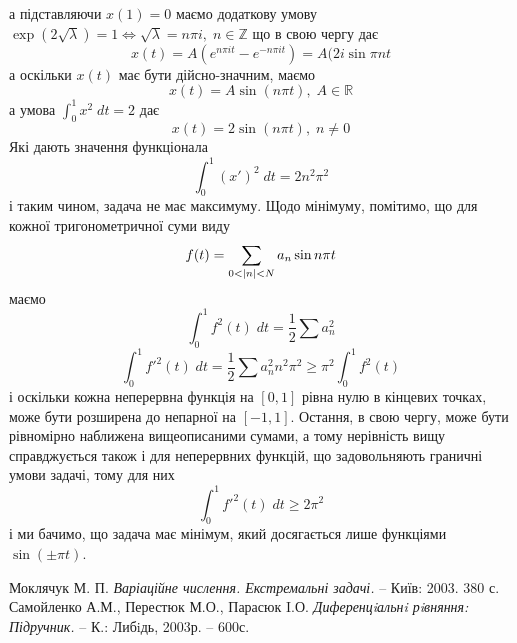 \documentclass[12pt]{article} %
\newcommand{\dt}{\;dt}
\begin{document}
	а підставляючи $x(1)=0$ маємо додаткову умову $\exp(2\sqrt{\lambda})=1\iff \sqrt{\lambda}=n\pi i,\;n\in\mathbb{Z}$ що в свою чергу дає
	\[x(t)=A(e^{n\pi it}-e^{-n\pi it})=A(2i\sin\pi nt\]
	а оскільки $x(t)$ має бути дійсно-значним, маємо
	\[x(t)=A\sin(n\pi t),\;A\in\mathbb{R}\]
	а умова $\int_0^1x^2\dt=2$ дає
	\[x(t)={2}\sin(n\pi t),\;n\neq0\]
	Які дають значення функціонала
	\[\int_0^1(x')^2\dt=2n^2\pi^2\]
	і таким чином, задача не має максимуму. Щодо мінімуму, помітимо, що для кожної тригонометричної суми виду
	\[f(t)=\sum_{0<\myabs{n}<N}a_n\sin n\pi t\]
	маємо
	\[\int_0^1f^2(t)\dt=\frac{1}{2}\sum a_n^2\]
	\[\int_0^1f'^2(t)\dt=\frac{1}{2}\sum{a_n^2n^2\pi^2}\geq\pi^2\int_0^1f^2(t)\]
	і оскільки кожна неперервна функція на $[0,1]$ рівна нулю в кінцевих точках, може
	бути розширена до непарної на $[-1,1]$. Остання, в свою чергу, може бути рівномірно наближена вищеописаними сумами, а тому
	нерівність вищу справджується також і для неперервних функцій, що задовольняють граничні умови задачі, тому для них
	\[\int_0^1f'^2(t)\dt\geq 2\pi^2\]
	і ми бачимо, що задача має мінімум, який досягається лише функціями $\sin(\pm\pi t)$.
\begin{thebibliography}{9}
Моклячук М. П. \emph{Варіаційне числення. Екстремальні задачі.} --
Київ: 2003. 380 с.
Самойленко А.М., Перестюк М.О., Парасюк I.О. \emph{Диференцiальнi рiвняння: Підручник.} -- К.: Либiдь, 2003р. -- 600с.
\end{thebibliography}
\end{document}
